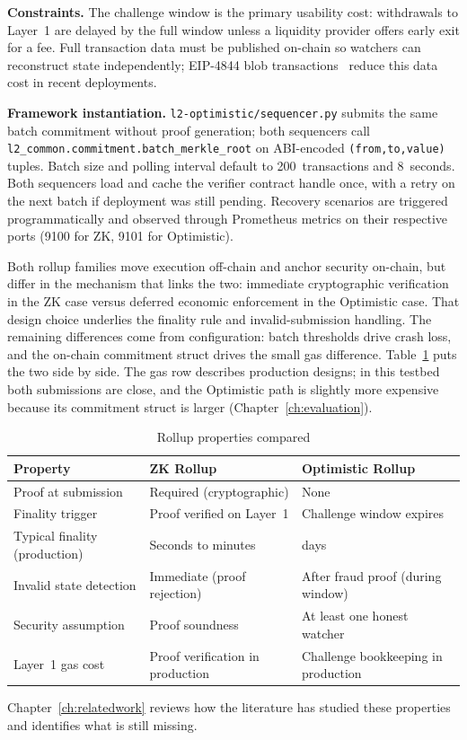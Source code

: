 \textbf{Constraints.}
The challenge window is the primary usability cost: withdrawals to Layer~1 are delayed by the full window unless a liquidity provider offers early exit for a fee. Full transaction data must be published on-chain so watchers can reconstruct state independently; EIP-4844 blob transactions~\cite{eip4844} reduce this data cost in recent deployments.

\textbf{Framework instantiation.}
\texttt{l2-optimistic/sequencer.py} submits the same batch commitment without proof generation; both sequencers call \texttt{l2\_common.commitment.batch\_merkle\_root} on ABI-encoded \texttt{(from,to,value)} tuples. Batch size and polling interval default to 200~transactions and 8~seconds. Both sequencers load and cache the verifier contract handle once, with a retry on the next batch if deployment was still pending. Recovery scenarios are triggered programmatically and observed through Prometheus metrics on their respective ports (9100 for ZK, 9101 for Optimistic).

Both rollup families move execution off-chain and anchor security on-chain, but differ in the mechanism that links the two: immediate cryptographic verification in the ZK case versus deferred economic enforcement in the Optimistic case. That design choice underlies the finality rule and invalid-submission handling. The remaining differences come from configuration: batch thresholds drive crash loss, and the on-chain commitment struct drives the small gas difference. Table~\ref{tab:bg-summary} puts the two side by side. The gas row describes production designs; in this testbed both submissions are close, and the Optimistic path is slightly more expensive because its commitment struct is larger (Chapter~\ref{ch:evaluation}).

\begin{table}[htbp]
    \centering
    \small
    \setlength{\tabcolsep}{4pt}
    \begin{tabular}{>{\raggedright\arraybackslash}p{3.4cm}|>{\raggedright\arraybackslash}p{4.2cm}|>{\raggedright\arraybackslash}p{4.2cm}}
        \hline
        \textbf{Property} & \textbf{ZK Rollup} & \textbf{Optimistic Rollup} \\
        \hline
        Proof at submission & Required (cryptographic) & None \\
        \hline
        Finality trigger & Proof verified on Layer~1 & Challenge window expires \\
        \hline
        Typical finality (production) & Seconds to minutes & 7 days \\
        \hline
        Invalid state detection & Immediate (proof rejection) & After fraud proof (during window) \\
        \hline
        Security assumption & Proof soundness & At least one honest watcher \\
        \hline
        Layer~1 gas cost & Proof verification in production & Challenge bookkeeping in production \\
        \hline
    \end{tabular}
    \caption{Rollup properties compared}
    \label{tab:bg-summary}
\end{table}

Chapter~\ref{ch:relatedwork} reviews how the literature has studied these properties and identifies what is still missing.
